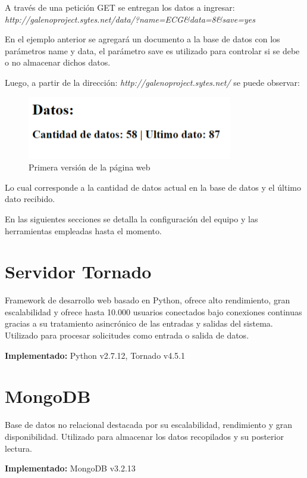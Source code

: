 A través de una petición GET se entregan los datos a ingresar:\\ \textit{http://galenoproject.sytes.net/data/?name=ECG\&data=8\&save=yes}

En el ejemplo anterior se agregará un documento a la base de datos con los parámetros name y data, el parámetro save es utilizado para controlar si se debe o no almacenar dichos datos.

Luego, a partir de la dirección: \textit{http://galenoproject.sytes.net/} se puede observar:

\begin{figure}[H]
	\centering
	\includegraphics[scale=0.6]{figuras/servidor/primera_version.png}
	\caption{Primera versión de la página web}
	\label{first_example}
\end{figure}

Lo cual corresponde a la cantidad de datos actual en la base de datos y el último dato recibido.



En las siguientes secciones se detalla la configuración del equipo y las herramientas empleadas hasta el momento.

\newpage
\section{Servidor Tornado}
Framework de desarrollo web basado en Python, ofrece alto rendimiento, gran escalabilidad y ofrece hasta 10.000 usuarios conectados bajo conexiones continuas gracias a su tratamiento asincrónico de las entradas y salidas del sistema. Utilizado para procesar solicitudes como entrada o salida de datos.

\textbf{Implementado:} Python v2.7.12, Tornado v4.5.1

\section{MongoDB}
Base de datos no relacional destacada por su escalabilidad, rendimiento y gran disponibilidad. Utilizado para almacenar los datos recopilados y su posterior lectura.

\textbf{Implementado:} MongoDB v3.2.13

